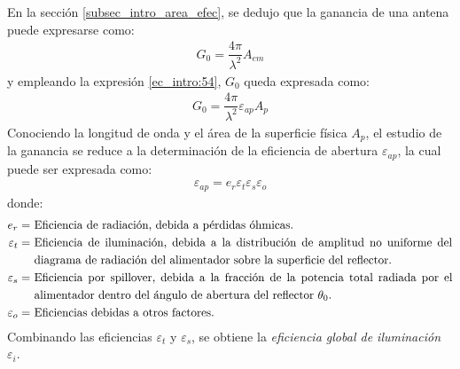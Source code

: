 En la sección \ref{subsec_intro_area_efec}, se dedujo que la ganancia de una antena puede expresarse como:
\begin{align}
G_0 = \dfrac{4\pi}{\lambda^2}A_{em}
\label{ec_principios:57}
\end{align}
y empleando la expresión \eqref{ec_intro:54}, $G_0$ queda expresada como:
\begin{align}
G_0 = \dfrac{4\pi}{\lambda^2}\varepsilon_{ap}A_p
\label{ec_principios:58}
\end{align}
Conociendo la longitud de onda y el área de la superficie física $A_p$, el estudio de la ganancia se reduce a la determinación de la eficiencia de abertura $\varepsilon_{ap}$, la cual puede ser expresada como:
\begin{align}
\varepsilon_{ap} = e_r\varepsilon_t\varepsilon_s\varepsilon_o
\label{ec_principios:59}
\end{align}
donde:
\begin{align*}
e_r = &\text{ Eficiencia de radiación, debida a pérdidas óhmicas.}\\
\varepsilon_t = &\text{ Eficiencia\hspace{0.43mm} de\hspace{0.43mm} iluminación,\hspace{0.43mm} debida\hspace{0.43mm} a\hspace{0.43mm} la\hspace{0.43mm} distribución\hspace{0.43mm} de\hspace{0.43mm} amplitud\hspace{0.43mm} no\hspace{0.43mm} uniforme\hspace{0.43mm} del}\\
&\text{ diagrama de radiación del alimentador sobre la superficie del reflector.}\\
\varepsilon_s = &\text{ Eficiencia\hspace{0.43mm} por\hspace{0.43mm} spillover,\hspace{0.43mm} debida\hspace{0.43mm} a\hspace{0.43mm} la\hspace{0.43mm} fracción\hspace{0.43mm} de\hspace{0.43mm} la\hspace{0.43mm} potencia\hspace{0.43mm} total\hspace{0.43mm} radiada\hspace{0.43mm} por\hspace{0.43mm} el}\\
&\text{ alimentador dentro del ángulo de abertura del reflector $\theta_0$.}\\
\varepsilon_o = &\text{ Eficiencias debidas a otros factores.}
\end{align*}
Combinando las eficiencias $\varepsilon_t$ y $\varepsilon_s$, se obtiene la \emph{eficiencia global de iluminación} $\varepsilon_i$.

